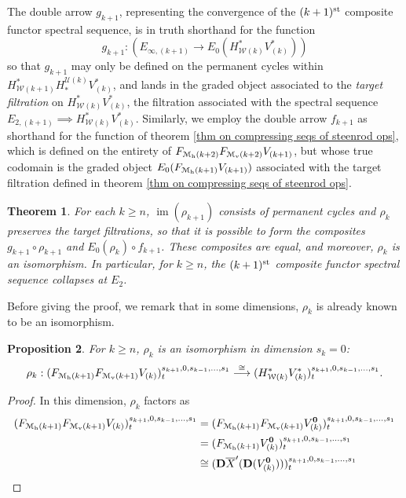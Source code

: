 \documentclass[11pt]{amsart}
\theoremstyle{plain}
\newtheorem{thm}{Theorem}[section]
\newtheorem{prop}[thm]{Proposition}
\theoremstyle{definition}
\DeclareMathOperator{\im}{im}
\renewcommand{\to}{\longrightarrow}
\newcommand{\calW}{\mathcal{W}}
\newcommand{\calU}{\mathcal{U}}
\newcommand{\calM}{\mathcal{M}}
\newcommand{\calMh}{\mathcal{M}_\textup{h}}
\theoremstyle{plain}
\newcommand{\UEAX}{\overline{X}'}%
\newcommand{\dual}{\mathbf{D}}
\begin{document}
\begin{Calculations of HWn for n nonzero}
The double arrow $g_{k+1}$, representing the convergence of the $(k+1)^{\textup{st}}$ composite functor spectral sequence, is in truth shorthand for the function
\[g_{k+1}:\left(E_{\infty,(k+1)}\to E_0(H^*_{\calW(k)}V^*_{(k)})\right)\]
so that $g_{k+1}$ may only be defined on the permanent cycles within $H^*_{\calW(k+1)}H_*^{\calU(k)}V^*_{(k)}$, and lands in the graded object associated to the \emph{target filtration} on $H^*_{\calW(k)}V^*_{(k)}$, the filtration associated with the spectral sequence $E_{2,(k+1)}\implies H^*_{\calW(k)}V^*_{(k)}$. Similarly, we employ the double arrow $f_{k+1}$ as shorthand for the function of theorem \ref{thm on compressing seqs of steenrod ops}, which is defined on the entirety of $F_{\calM_{\textup{h}}(k+2)}F_{\calM_{\textup{v}}(k+2)}V_{(k+1)}$, but whose true codomain is the graded object $E_0(F_{\calMh(k+1)}V_{(k+1)})$ associated with the target filtration defined in theorem \ref{thm on compressing seqs of steenrod ops}.
\begin{thm}\label{thm on collapsing of most sseqs}
For each $k\geq n$, $\im(\rho_{k+1})$ consists of permanent cycles and $\rho_k$ preserves the target filtrations, so that it is possible to form the composites $g_{k+1}\circ \rho_{k+1}$ and $E_0(\rho_{k})\circ f_{k+1}$. These composites are equal, and moreover, $\rho_k$ is an isomorphism. In particular, for $k\geq n$, the  $(k+1)^{\textup{st}}$ composite functor spectral sequence collapses at $E_2$.
\end{thm}
Before giving the proof, we remark that in some dimensions, $\rho_k$ is already known to be an isomorphism.
\begin{prop}\label{isomorphism rho k in some dims}
For $k\geq n$, $\rho_k$ is an isomorphism in dimension $s_k=0$:
\[\rho_k:(F_{\calM_{\textup{h}}(k+1)}F_{\calM_{\textup{v}}(k+1)}V_{(k)})^{s_{k+1},0,s_{k-1},\ldots,s_1}_{t} \overset{\cong}{\to}(H^*_{\calW(k)}V^*_{(k)})^{s_{k+1},0,s_{k-1},\ldots,s_1}_{t}.\]
\end{prop}
\begin{proof}
In this dimension, $\rho_k$ factors as
\begin{alignat*}{2}
(F_{\calM_{\textup{h}}(k+1)}F_{\calM_{\textup{v}}(k+1)}V_{(k)})^{s_{k+1},0,s_{k-1},\ldots,s_1}_{t}
&=
(F_{\calM_{\textup{h}}(k+1)}F_{\calM_{\textup{v}}(k+1)}V_{(k)}^{\textbf{\textup{0}}})^{s_{k+1},0,s_{k-1},\ldots,s_1}_{t}\\
&=(F_{\calM_{\textup{h}}(k+1)}V_{(k)}^{\textbf{\textup{0}}})^{s_{k+1},0,s_{k-1},\ldots,s_1}_{t}\\
&\cong (\dual\UEAX(\dual(V_{(k)}^{\textbf{\textup{0}}})))^{s_{k+1},0,s_{k-1},\ldots,s_1}_{t}\\

\end{alignat*}
\end{proof}
\end{Calculations of HWn for n nonzero}
\end{document}
